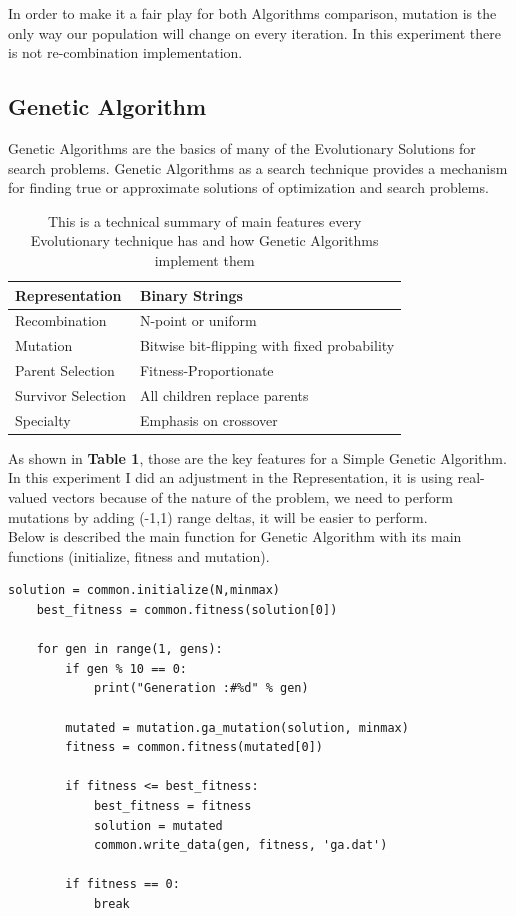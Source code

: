 \documentclass[]{spie}  %
\begin{document}
In order to make it a fair play for both Algorithms comparison, mutation is the only way our population will change on every iteration. In this experiment there is not re-combination implementation.

\subsection{Genetic Algorithm}
\label{sec:ga}
Genetic Algorithms are the basics of many of the Evolutionary Solutions for search problems. Genetic Algorithms as a search technique provides a mechanism for finding true or approximate solutions of optimization and search problems. 

\begin{table}[ht]
\caption{ This is a technical summary of main features every Evolutionary technique has and how Genetic Algorithms implement them} 
\label{tab:fonts}
\begin{center}       
\begin{tabular}{|l|l|}
\hline
\rule[-1ex]{0pt}{3.5ex}  Representation & Binary Strings  \\
\hline
\rule[-1ex]{0pt}{3.5ex}  Recombination & N-point or uniform   \\
\hline
\rule[-1ex]{0pt}{3.5ex}  Mutation & Bitwise bit-flipping with fixed probability   \\
\hline
\rule[-1ex]{0pt}{3.5ex}  Parent Selection & Fitness-Proportionate   \\
\hline
\rule[-1ex]{0pt}{3.5ex}  Survivor Selection & All children replace parents   \\
\hline
\rule[-1ex]{0pt}{3.5ex}  Specialty & Emphasis on crossover  \\
\hline
\end{tabular}
\end{center}
\end{table} 

As shown in \textbf{Table 1}, those are the key features for a Simple Genetic Algorithm. In this experiment I did an adjustment in the Representation, it is using real-valued vectors because of the nature of the problem, we need to perform mutations by adding (-1,1) range deltas, it will be easier to perform.
\\
Below is described the main function for Genetic Algorithm with its main functions (initialize, fitness and mutation). 
\\
\begin{lstlisting}[frame=single]  % Start your code-block 
    solution = common.initialize(N,minmax)
    best_fitness = common.fitness(solution[0])

    for gen in range(1, gens):
        if gen % 10 == 0:
            print("Generation :#%d" % gen)

        mutated = mutation.ga_mutation(solution, minmax)
        fitness = common.fitness(mutated[0])

        if fitness <= best_fitness:
            best_fitness = fitness
            solution = mutated
            common.write_data(gen, fitness, 'ga.dat')

        if fitness == 0:
            break
\end{lstlisting}
\end{document}
